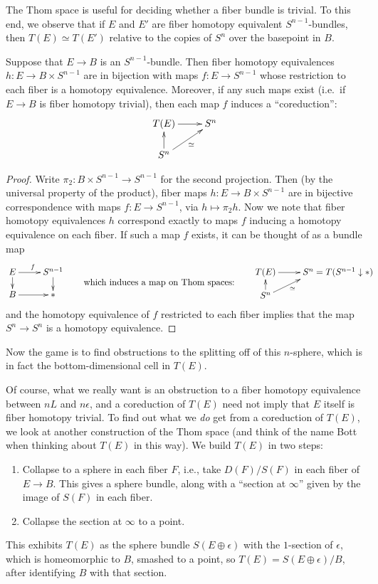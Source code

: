 The Thom space is useful for deciding whether a fiber bundle is trivial.  To this end, we observe that if $E$ and $E'$ are fiber homotopy equivalent $S^{n-1}$-bundles, then $T(E) \simeq T(E')$ relative to the copies of $S^n$ over the basepoint in $B$.
\begin{lem}\label{LemOnFHTrivialisations}
Suppose that $E \to B$ is an $S^{n-1}$-bundle. Then fiber homotopy equivalences $h:E\to B\times S^{n-1}$ are in bijection with maps $f:E\to S^{n-1}$ whose restriction to each fiber is a homotopy equivalence. Moreover, if any such maps exist (i.e.\ if $E\to B$ is fiber homotopy trivial), then each map $f$ induces a ``coreduction'':
\[\xymatrix@R=.6cm{
T(E)\ar[r]&S^n\\
S^n\ar[u]\ar[ur]_\simeq
}\]
\end{lem}
\begin{proof}
Write $\pi_2:B\times S^{n-1}\to S^{n-1}$ for the second projection. Then (by the universal property of the product), fiber maps $h:E\to B\times S^{n-1}$ are in bijective correspondence with maps $f:E\to S^{n-1}$, via $h\mapsto \pi_2h$. Now we note that fiber homotopy equivalences $h$ correspond exactly to maps $f$ inducing a homotopy equivalence on each fiber. If such a map $f$ exists, it can be thought of as a bundle map
\[\xymatrix@R=.4cm{
E\ar[r]^f\ar[d]& S^{n-1}\ar[d]\\
B\ar[r]&\ast
}\raisebox{-.4cm}{\textup{\qquad which induces a map on Thom spaces:\qquad}}
\xymatrix@R=.4cm{
T(E)\ar[r]&S^n=\makebox[0cm][l]{$T(S^{n-1}\downarrow*)$}\\
S^n\ar[u]\ar[ur]_\simeq
}\qquad\qquad\]
and the homotopy equivalence of $f$ restricted to each fiber implies that the map $S^n\to S^n$ is a homotopy equivalence.
\end{proof}
\noindent Now the game is to find obstructions to the splitting off of this $n$-sphere, which is in fact the bottom-dimensional cell in $T(E)$.

Of course, what we really want is an obstruction to a fiber homotopy equivalence between $nL$ and $n \epsilon$, and a coreduction of $T(E)$ need not imply that $E$ itself is fiber homotopy trivial.  To find out what we \emph{do} get from a coreduction of $T(E)$, we look at another construction of the Thom space (and think of the name Bott when thinking about $T(E)$ in this way).  We build $T(E)$ in two steps:
\begin{enumerate}
\item Collapse to a sphere in each fiber $F$, i.e., take $D(F) / S(F)$ in each fiber of $E \to B$.  This gives a sphere bundle, along with a ``section at $\infty$'' given by the image of $S(F)$ in each fiber.
\item Collapse the section at $\infty$ to a point.
\end{enumerate}
This exhibits $T(E)$ as the sphere bundle $S(E \oplus \epsilon)$ with the $1$-section of $\epsilon$, which is homeomorphic to $B$, smashed to a point, so $T(E) = S(E \oplus \epsilon) / B$, after identifying $B$ with that section. %


